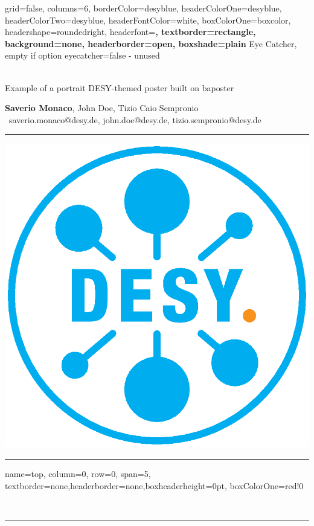 \documentclass[a0paper,portrait]{baposter}
\begin{document}


\begin{poster}{
	grid=false,
	columns=6,
	borderColor=desyblue,
	headerColorOne=desyblue,
	headerColorTwo=desyblue,
	headerFontColor=white,
	boxColorOne=boxcolor,
	headershape=roundedright,
	headerfont=\Large\sf\bf,
	textborder=rectangle,
	background=none,
	headerborder=open,
    boxshade=plain
}
{
	Eye Catcher, empty if option eyecatcher=false - unused
}
{\sf\bf
	\rule{0cm}{1cm}\\
    \color{desyblue} Example of a portrait DESY-themed poster built on baposter
}
{
	\vspace{1em} \textbf{Saverio Monaco}, John Doe, Tizio Caio Sempronio\\
	{\smaller \faEnvelopeO\, saverio.monaco@desy.de, john.doe@desy.de, tizio.sempronio@desy.de}
}
{
\setlength\fboxsep{0pt}
\setlength\fboxrule{0.5pt}
	\rule{.2cm}{0cm}
	\rule{0cm}{4.2cm}
	\includegraphics[height=.14\linewidth]{./assets/DESY}
	\rule{.5cm}{0cm}
}

\headerbox{}%
{name=top, column=0, row=0, span=5,
	textborder=none,headerborder=none,boxheaderheight=0pt, boxColorOne=red!0}{
	\rule{0pt}{0cm}\\[-.3cm]
	{\color{desyblue}\rule{\linewidth}{.05cm}}\\[-0.5cm]
}


\end{poster}
\end{document}
